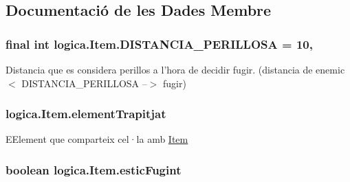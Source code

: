 \subsection{Documentació de les Dades Membre}
\hypertarget{classlogica_1_1_item_aeb47370bb9dfdc7d690d546d74ea0854}{
\subsubsection[{D\+I\+S\+T\+A\+N\+C\+I\+A\+\_\+\+P\+E\+R\+I\+L\+L\+O\+S\+A}]{\setlength{\rightskip}{0pt plus 5cm}final int logica.\+Item.\+D\+I\+S\+T\+A\+N\+C\+I\+A\+\_\+\+P\+E\+R\+I\+L\+L\+O\+S\+A = 10\hspace{0.3cm}{\ttfamily [static]}, {\ttfamily [private]}}}\label{classlogica_1_1_item_aeb47370bb9dfdc7d690d546d74ea0854}
Distancia que es considera perillos a l'hora de decidir fugir. (distancia de enemic $<$ D\+I\+S\+T\+A\+N\+C\+I\+A\+\_\+\+P\+E\+R\+I\+L\+L\+O\+S\+A --$>$ fugir) \hypertarget{classlogica_1_1_item_a526b80840c8330393362f26926c33f07}{
\subsubsection[{element\+Trapitjat}]{ logica.\+Item.\+element\+Trapitjat\hspace{0.3cm}{\ttfamily [private]}}}\label{classlogica_1_1_item_a526b80840c8330393362f26926c33f07}
E\+Element que comparteix cel·la amb \hyperlink{classlogica_1_1_item}{Item} \hypertarget{classlogica_1_1_item_af8d84d49ac5ab305f8ddaf457f498740}{
\subsubsection[{estic\+Fugint}]{\setlength{\rightskip}{0pt plus 5cm}boolean logica.\+Item.\+estic\+Fugint\hspace{0.3cm}{\ttfamily [private]}}}\label{classlogica_1_1_item_af8d84d49ac5ab305f8ddaf457f498740}

